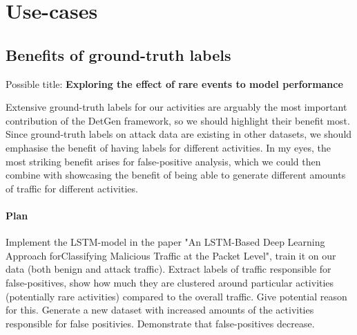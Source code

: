 \documentclass{article}
\begin{document}
\section{Use-cases}


\subsection{Benefits of ground-truth labels}
Possible title: \textbf{Exploring the effect of rare events to model performance}

Extensive ground-truth labels for our activities are arguably the most important contribution of the DetGen framework, so we should highlight their benefit most. Since ground-truth labels on attack data are existing in other datasets, we should emphasise the benefit of having labels for different activities. In my eyes, the most striking benefit arises for false-positive analysis, which we could then combine with showcasing the benefit of being able to generate different amounts of traffic for different activities.


\paragraph{Plan}
Implement the LSTM-model in the paper "An LSTM-Based Deep Learning Approach forClassifying Malicious Traffic at the Packet Level", train it on our data (both benign and attack traffic). Extract labels of traffic responsible for false-positives, show how much they are clustered around particular activities (potentially rare activities) compared to the overall traffic. Give potential reason for this. Generate a new dataset with increased amounts of the activities responsible for false positivies. Demonstrate that false-positives decrease.
\end{document}
